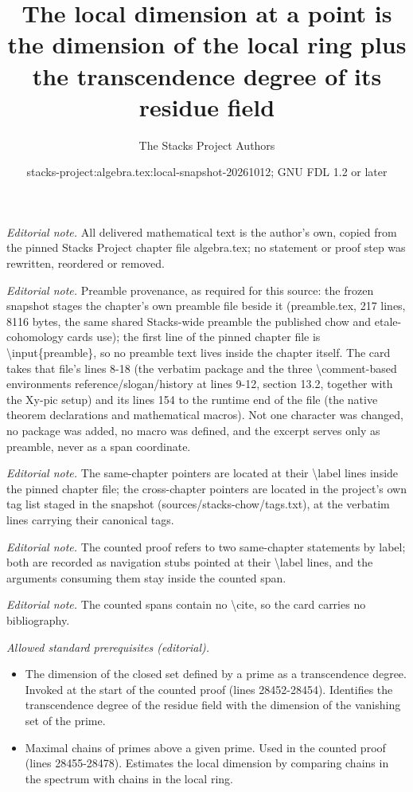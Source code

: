 \documentclass[10pt,a4paper]{amsart}
\title{The local dimension at a point is the dimension of the local ring plus the transcendence degree of its residue field}
\author{The Stacks Project Authors}
\date{stacks-project:algebra.tex:local-snapshot-20261012; GNU FDL 1.2 or later}
\theoremstyle{plain}
\theoremstyle{definition}
\theoremstyle{remark}
\numberwithin{equation}{subsection}
\begin{document}
\maketitle
\noindent\textit{Editorial note.} All delivered mathematical text is the author's own, copied from the pinned Stacks Project chapter file algebra.tex; no statement or proof step was rewritten, reordered or removed.\par\medskip
\noindent\textit{Editorial note.} Preamble provenance, as required for this source: the frozen snapshot stages the chapter's own preamble file beside it (preamble.tex, 217 lines, 8116 bytes, the same shared Stacks-wide preamble the published chow and etale-cohomology cards use); the first line of the pinned chapter file is \textbackslash{}input\{preamble\}, so no preamble text lives inside the chapter itself. The card takes that file's lines 8-18 (the verbatim package and the three \textbackslash{}comment-based environments reference/slogan/history at lines 9-12, section 13.2, together with the Xy-pic setup) and its lines 154 to the runtime end of the file (the native theorem declarations and mathematical macros). Not one character was changed, no package was added, no macro was defined, and the excerpt serves only as preamble, never as a span coordinate.\par\medskip
\noindent\textit{Editorial note.} The same-chapter pointers are located at their \textbackslash{}label lines inside the pinned chapter file; the cross-chapter pointers are located in the project's own tag list staged in the snapshot (sources/stacks-chow/tags.txt), at the verbatim lines carrying their canonical tags.\par\medskip
\noindent\textit{Editorial note.} The counted proof refers to two same-chapter statements by label; both are recorded as navigation stubs pointed at their \textbackslash{}label lines, and the arguments consuming them stay inside the counted span.\par\medskip
\noindent\textit{Editorial note.} The counted spans contain no \textbackslash{}cite, so the card carries no bibliography.\par\medskip
\noindent\textit{Allowed standard prerequisites (editorial).}\begin{itemize}
\item The dimension of the closed set defined by a prime as a transcendence degree. Invoked at the start of the counted proof (lines 28452-28454). Identifies the transcendence degree of the residue field with the dimension of the vanishing set of the prime.
\item Maximal chains of primes above a given prime. Used in the counted proof (lines 28455-28478). Estimates the local dimension by comparing chains in the spectrum with chains in the local ring.
\end{itemize}\medskip
\end{document}
